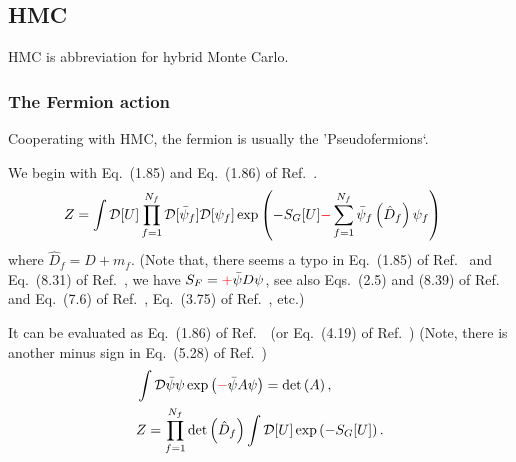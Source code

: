 \subsection{\label{sec:hmc}HMC}

HMC is abbreviation for hybrid Monte Carlo.

\subsubsection{\label{sec:hmc_action}The Fermion action}

Cooperating with HMC, the fermion is usually the 'Pseudofermions`.

We begin with Eq.~(1.85) and Eq.~(1.86) of Ref.~\cite{latticeqcdbook2017}.
\begin{equation}
\begin{split}
&Z=\int \mathcal{D}[U] \prod _{f=1}^{N_f} \mathcal {D}[\bar{\psi}_f]\mathcal {D}[\psi _f]\exp \left(-S_G[U]\textcolor[rgb]{1,0,0}{-}\sum _{f=1}^{N_f}\bar{\psi} _f\left(\hat{D}_f\right)\psi _f\right)
\end{split}
\end{equation}
where $\hat{D}_f=D+m_f$. (Note that, there seems a typo in Eq.~(1.85) of Ref.~\cite{latticeqcdbook2017} and Eq.~(8.31) of Ref.~\cite{latticeqcdbook2010}, we have $S_F=\textcolor[rgb]{1,0,0}{+}\bar{\psi}D\psi$, see also Eqs.~(2.5) and (8.39) of Ref.~\cite{latticeqcdbook2010} and Eq.~(7.6) of Ref.~\cite{latticeqcdbook1998}, Eq.~(3.75) of Ref.~\cite{latticeqcdbook2017}, etc.)

It can be evaluated as Eq.~(1.86) of Ref.~\cite{latticeqcdbook2017}~(or Eq.~(4.19) of Ref.~\cite{condensedmatterbookAltland}) (Note, there is another minus sign in Eq.~(5.28) of Ref.~\cite{latticeqcdbook2010})
\begin{equation}
\begin{split}
&\int \mathcal{D}{\bar{\psi}}\psi \exp \left(\textcolor[rgb]{1,0,0}{-}\bar{\psi}A\psi\right)=\det \left(A\right),\\
&Z=\prod _{f=1}^{N_f} \det \left(\hat{D}_f\right)\int \mathcal{D}[U] \exp \left(-S_G[U]\right).\\
\end{split}
\end{equation}

